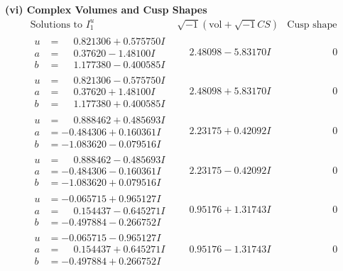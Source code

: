 \documentclass[1p]{elsarticle_modified}
\theoremstyle{definition}
\newcommand{\I}{\sqrt{-1}}
\begin{document}
\newpage\flushleft \textbf{(vi) Complex Volumes and Cusp Shapes}
$$\begin{array}{c|c|c}  
\text{Solutions to }I^u_{1}& \I (\text{vol} + \sqrt{-1}CS) & \text{Cusp shape}\\
 \hline 
\begin{aligned}
u &= \phantom{-}0.821306 + 0.575750 I \\
a &= \phantom{-}0.37620 - 1.48100 I \\
b &= \phantom{-}1.177380 - 0.400585 I\end{aligned}
 & \phantom{-}2.48098 - 5.83170 I & \phantom{-0.000000 } 0 \\ \hline\begin{aligned}
u &= \phantom{-}0.821306 - 0.575750 I \\
a &= \phantom{-}0.37620 + 1.48100 I \\
b &= \phantom{-}1.177380 + 0.400585 I\end{aligned}
 & \phantom{-}2.48098 + 5.83170 I & \phantom{-0.000000 } 0 \\ \hline\begin{aligned}
u &= \phantom{-}0.888462 + 0.485693 I \\
a &= -0.484306 + 0.160361 I \\
b &= -1.083620 - 0.079516 I\end{aligned}
 & \phantom{-}2.23175 + 0.42092 I & \phantom{-0.000000 } 0 \\ \hline\begin{aligned}
u &= \phantom{-}0.888462 - 0.485693 I \\
a &= -0.484306 - 0.160361 I \\
b &= -1.083620 + 0.079516 I\end{aligned}
 & \phantom{-}2.23175 - 0.42092 I & \phantom{-0.000000 } 0 \\ \hline\begin{aligned}
u &= -0.065715 + 0.965127 I \\
a &= \phantom{-}0.154437 - 0.645271 I \\
b &= -0.497884 - 0.266752 I\end{aligned}
 & \phantom{-}0.95176 + 1.31743 I & \phantom{-0.000000 } 0 \\ \hline\begin{aligned}
u &= -0.065715 - 0.965127 I \\
a &= \phantom{-}0.154437 + 0.645271 I \\
b &= -0.497884 + 0.266752 I\end{aligned}
 & \phantom{-}0.95176 - 1.31743 I & \phantom{-0.000000 } 0 \\ \hline\begin{aligned}

\end{aligned}
\end{array}$$
\end{document}
